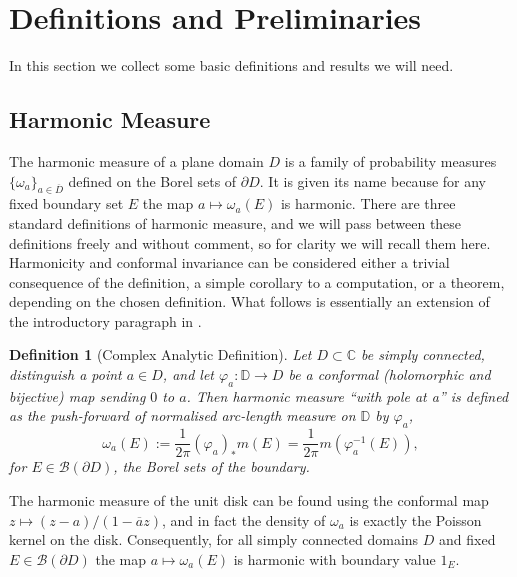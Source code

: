 \documentclass[a4paper, oneside, 12pt]{amsart}
\newtheorem{definition}{Definition}
\renewcommand{\phi}{\varphi}
\newcommand{\mc}{\mathcal}
\newcommand{\C}{\mathbb{C}}
\newcommand{\D}{\mathbb{D}}
\newcommand{\fr}{\frac}
\begin{document}
\section{Definitions and Preliminaries}\label{sec2}

In this section we collect some basic definitions and results we will need.

\subsection{Harmonic Measure}
The harmonic measure of a plane domain $D$ is a family of probability measures 
$\{\omega_a\}_{a\in \overline{D}}$ defined on the Borel sets of $\partial D$. It is given its name because for any 
fixed boundary set $E$ the map $a\mapsto\omega_a(E)$ is harmonic. There are three standard 
definitions of harmonic measure, and we will pass between these definitions freely and without comment, 
so for clarity we will recall them here. Harmonicity and conformal invariance can be considered either
a trivial consequence of the definition, a simple corollary to a computation, or a theorem, depending on the chosen
definition. What follows is essentially an extension of the introductory paragraph in \cite{makarov}.
\\
\begin{definition}[Complex Analytic Definition]
 Let $D\subset \C$ be simply connected, distinguish a point $a\in D$, and let $\phi_a:\D\to D$ be a 
conformal (holomorphic and bijective) map sending $0$ to $a$. Then harmonic measure 
``with pole at a'' is defined as the push-forward of normalised arc-length measure on $\D$ by 
$\phi_a$,
$$
	\omega_a(E) := \fr{1}{2\pi}(\varphi_a)_*m(E) = \fr{1}{2\pi} m(\varphi_a^{-1}(E)),
$$
for $E\in \mc{B}(\partial D)$, the Borel sets of the boundary.
\end{definition}
The harmonic
measure of the unit disk can be found using the conformal map $z\mapsto (z-a)/(1-\overline{a}z)$, and in fact the density of $\omega_a$ is exactly the Poisson kernel on the disk. Consequently, for all 
simply connected domains $D$ and fixed $E\in\mc{B}(\partial D)$ the map $a\mapsto \omega_a(E)$ 
is harmonic with boundary value $1_E$. 
\end{document}
